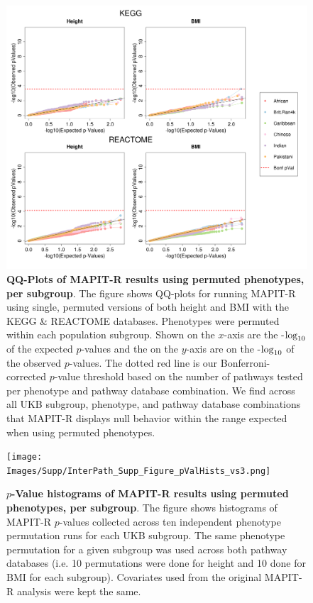 \documentclass[12pt,a4paper]{article}
\def\log{{\rm log}}
\begin{document}
\begin{figure}[htbp]
\centering
\includegraphics[scale=.35]{Images/Supp/InterPath_Supp_Figure_perm1_QQPlots_AllPaths_vs2.png}
\caption[TBD]{\textbf{QQ-Plots of MAPIT-R results using permuted phenotypes, per subgroup}. The figure shows QQ-plots for running MAPIT-R using single, permuted versions of both height and BMI with the KEGG \& REACTOME databases. Phenotypes were permuted within each population subgroup. Shown on the $x$-axis are the -$\log_{10}$ of the expected $p$-values and the on the $y$-axis are on the -$\log_{10}$ of the observed $p$-values. The dotted red line is our Bonferroni-corrected $p$-value threshold based on the number of pathways tested per phenotype and pathway database combination. We find across all UKB subgroup, phenotype, and pathway database combinations that MAPIT-R displays null behavior within the range expected when using permuted phenotypes.}
\label{InterPath-Supp-Figure-perm1-QQPlots-AllPaths}
\end{figure}
\clearpage

\setlength{\footskip}{3cm}
\begin{figure}[htbp]
\centering
\vspace*{-2cm}
\texttt{[image: Images/Supp/InterPath\_Supp\_Figure\_pValHists\_vs3.png]}
\caption[TBD]{\textbf{$p$-Value histograms of MAPIT-R results using permuted phenotypes, per subgroup}. The figure shows histograms of MAPIT-R $p$-values collected across ten independent phenotype permutation runs for each UKB subgroup. The same phenotype permutation for a given subgroup was used across both pathway databases (i.e. 10 permutations were done for height and 10 done for BMI for each subgroup). Covariates used from the original MAPIT-R analysis were kept the same.}
\label{InterPath-Supp-Figure-10perms-pValHists}
\end{figure}
\clearpage
\setlength{\footskip}{1cm}
\end{document}
